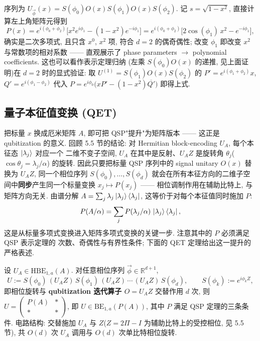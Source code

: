 \documentclass[utf8]{article} %
\numberwithin{equation}{section}   %
\newtheorem{Thm}{\hskip 2em {\color{blue} 定理}}[subsection]
\newtheorem{Eg}{\hskip 2em {\color{black} 例}}[subsection]
\begin{document}
\begin{Eg}[二阶 QSP: $d = 2$]
    序列为 $U_{\vec\phi}(x) = S(\phi_0)O(x)S(\phi_1)O(x)S(\phi_2)$. 记 $s = \sqrt{1-x^2}$,
    直接计算左上角矩阵元得到
    \begin{equation}
        P(x) = e^{i(\phi_0+\phi_2)}\big[x^2 e^{i\phi_1} - (1-x^2) e^{-i\phi_1}\big]
        = e^{i(\phi_0+\phi_2)}\big[2\cos(\phi_1)\, x^2 - e^{-i\phi_1}\big],
    \end{equation}
    确实是二次多项式, 且只含 $x^0$, $x^2$ 项, 符合 $d = 2$ 的偶奇偶性;
    改变 $\phi_1$ 即改变 $x^2$ 与常数项的相对系数 —— 直观展示了
    phase parameters $\to$ polynomial coefficients. 这也可以看作表示定理归纳
    (左乘 $S(\phi_0)O(x)$ 的递推, 见上面证明)在 $d=2$ 时的显式验证:
    取 $U^{(1)} = S(\phi_1)O(x)S(\phi_2)$ 的 $P' = e^{i(\phi_1+\phi_2)}x$,
    $Q' = e^{i(\phi_1-\phi_2)}$ 代入 $P = e^{i\phi_0}\big(xP' - (1-x^2)\overline{Q'}\big)$
    即得上式.
\end{Eg}

\subsection{量子本征值变换 (QET)}

把标量 $x$ 换成厄米矩阵 $A$, 即可把 QSP"提升"为矩阵版本 —— 这正是 qubitization 的意义.
回顾 5.5 节的结论: 对 Hermitian block-encoding $U_A$, 每个本征态 $\ket{\lambda_j}$ 对应一个
二维不变子空间, $U_A$ 在其中是反射、$U_A Z$ 是旋转角 $\theta_j$($\cos\theta_j = \lambda_j/\alpha$)
的旋转. 因此只要把标量 QSP 序列中的 signal unitary $O(x)$ 替换为 $U_A Z$, 同一个相位序列
$S(\phi_0), \dots, S(\phi_d)$ 就会在所有本征方向的二维子空间中\textbf{同步}产生同一个标量变换
$x_j \mapsto P(x_j)$ —— 相位调制作用在辅助比特上, 与矩阵方向无关. 由谱分解
$A = \sum_j \lambda_j \ket{\lambda_j}\bra{\lambda_j}$, 这等价于对每个本征值同时施加 $P$:
\begin{equation}
    P(A/\alpha) = \sum_j P(\lambda_j/\alpha)\,\ket{\lambda_j}\bra{\lambda_j},
\end{equation}
这是从标量多项式变换进入矩阵多项式变换的关键一步. 注意其中的 $P$ 必须满足 QSP 表示定理的
次数、奇偶性与有界性条件; 下面的 QET 定理给出这一提升的严格表述.

\begin{Thm}
    设 $U_A \in \mathrm{HBE}_{1,a}(A)$. 对任意相位序列 $\vec\phi \in \mathbb{R}^{d+1}$,
    \begin{equation}
        U := S(\phi_0)\,(U_A Z)\, S(\phi_1)\,(U_A Z)\, \cdots\, (U_A Z)\, S(\phi_d),
        \qquad S(\phi_k) := e^{i\phi_k Z},
    \end{equation}
    即相位旋转与 \textbf{qubitization 迭代算子 $O = U_A Z$} 交替作用 $d$ 次, 则
    $U = \begin{pmatrix} P(A) & \ast \\ \ast & \ast \end{pmatrix}$,
    即 $U \in \mathrm{BE}_{1,a}(P(A))$, 其中 $P$ 满足 QSP 定理的三条条件.
    电路结构: 交替施加 $U_A$ 与 $Z$($Z = 2\Pi - I$ 为辅助比特上的受控相位, 见 5.5 节),
    共 $O(d)$ 次 $U_A$ 调用与 $O(d)$ 次单比特相位旋转.
\end{Thm}
\end{document}
